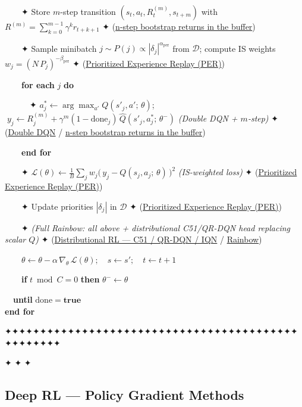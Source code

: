 \documentclass[11pt]{article}
\begin{document}
\begin{pseudobox}
\strut ~~~~✦ Store \(m\)-step transition
\((s_t, a_t, R^{(m)}_t, s_{t+m})\) with
\(R^{(m)}=\sum_{k=0}^{m-1}\gamma^k r_{t+k+1}\) ✦
(\hyperref[trick-3-3-5]{n-step bootstrap returns in the buffer})\\
\strut ~~~~✦ Sample minibatch
\(j \sim P(j) \propto |\delta_j|^{\alpha_\text{per}}\) from
\(\mathcal{D}\); compute IS weights
\(w_j = (N\,P_j)^{-\beta_\text{per}}\) ✦
(\hyperref[trick-3-3-1]{Prioritized Experience Replay (PER)})\\
\strut ~~~~\textbf{for each} \(j\) \textbf{do}\\
\strut ~~~~~~✦ \(a^*_j \leftarrow \arg\max_{a'} Q(s'_j, a';\, \theta)\);
\(\;y_j \leftarrow R^{(m)}_j + \gamma^m(1-\text{done}_j)\,\hat{Q}(s'_j, a^*_j;\, \theta^{-})\)
\emph{(Double DQN + \(m\)-step)} ✦ (\hyperref[trick-3-3-2]{Double DQN} /
\hyperref[trick-3-3-5]{n-step bootstrap returns in the buffer})\\
\strut ~~~~\textbf{end for}\\
\strut ~~~~✦
\(\mathcal{L}(\theta) \leftarrow \frac{1}{B}\sum_j w_j\bigl(\, y_j - Q(s_j, a_j;\, \theta) \,\bigr)^{2}\)
\emph{(IS-weighted loss)} ✦ (\hyperref[trick-3-3-1]{Prioritized
Experience Replay (PER)})\\
\strut ~~~~✦ Update priorities \(|\delta_j|\) in \(\mathcal{D}\) ✦
(\hyperref[trick-3-3-1]{Prioritized Experience Replay (PER)})\\
\strut ~~~~✦ \emph{(Full Rainbow: all above + distributional C51/QR-DQN
head replacing scalar \(Q\))} ✦ (\hyperref[trick-3-3-6]{Distributional
RL --- C51 / QR-DQN / IQN} / \hyperref[trick-3-3-7]{Rainbow})\\
\strut ~~~~\(\theta \leftarrow \theta - \alpha\, \nabla_{\theta}\, \mathcal{L}(\theta);\quad s \leftarrow s';\quad t \leftarrow t + 1\)\\
\strut ~~~~\textbf{if} \(t \bmod C = 0\) \textbf{then}
\(\theta^{-} \leftarrow \theta\)\\
\strut ~~\textbf{until} \(\text{done} = \mathbf{true}\)\\
\textbf{end for}

\end{pseudobox}

    ✦✦✦✦✦✦✦✦✦✦✦✦✦✦✦✦✦✦✦✦✦✦✦✦✦✦✦✦✦✦✦✦✦✦✦✦✦✦✦✦✦✦✦✦✦✦✦✦✦✦

    \clearpage

✦ ✦ ✦

\subsection{Deep RL --- Policy Gradient
Methods}\label{deep-rl-policy-gradient-methods}
\end{document}
